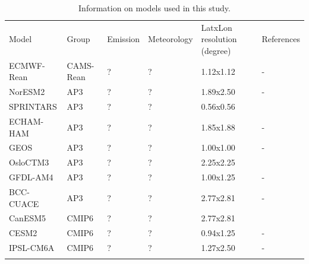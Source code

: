 \documentclass[journal abbreviation, manuscript]{copernicus}
\begin{document}
\begin{table}
 \begin{tabularx}{\textwidth}{lllllX}
  \tophline
  Model      & Group     & Emission & Meteorology & LatxLon resolution (degree) & References                                                          \\
  \middlehline
  ECMWF-Rean & CAMS-Rean & ?        & ?           & 1.12x1.12            & -                                                                   \\
  NorESM2    & AP3       & ?        & ?           & 1.89x2.50            & -                                                                   \\
  SPRINTARS  & AP3       & ?        & ?           & 0.56x0.56            & \cite{takemura2000global,takemura2002single,takemura2005simulation} \\
  ECHAM-HAM  & AP3       & ?        & ?           & 1.85x1.88            & -                                                                   \\
  GEOS       & AP3       & ?        & ?           & 1.00x1.00            & -                                                                   \\
  OsloCTM3   & AP3       & ?        & ?           & 2.25x2.25            & \cite{lund2018concentrations,myhre2009modelled}                     \\
  GFDL-AM4   & AP3       & ?        & ?           & 1.00x1.25            & -                                                                   \\
  BCC-CUACE  & AP3       & ?        & ?           & 2.77x2.81            & -                                                                   \\
  CanESM5    & CMIP6     & ?        & ?           & 2.77x2.81            & \cite{gmd-12-4823-2019}                                             \\
  CESM2      & CMIP6     & ?        & ?           & 0.94x1.25            & -                                                                   \\
  IPSL-CM6A  & CMIP6     & ?        & ?           & 1.27x2.50            & -                                                                   \\
  \bottomhline
 \end{tabularx}
 \caption{Information on models used in this study.}
 \label{table:models}
\end{table}
\end{document}
